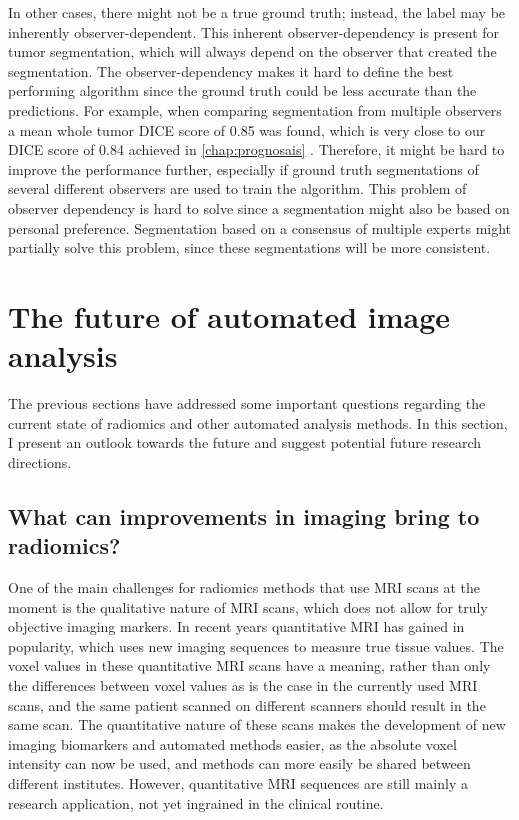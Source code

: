 In other cases, there might not be a true ground truth; instead, the label may be inherently observer-dependent.
This inherent observer-dependency is present for \gls{tumor} segmentation, which will always depend on the observer that created the segmentation.
The observer-dependency makes it hard to define the best performing algorithm since the ground truth could be less accurate than the predictions.
For example, when comparing segmentation from multiple observers a mean whole \gls{tumor} DICE score of 0.85 was found, which is very close to our DICE score of 0.84 achieved in \cref{chap:prognosais} \autocite{menze2015brats}.
Therefore, it might be hard to improve the performance further, especially if ground truth segmentations of several different observers are used to train the algorithm.
This problem of observer dependency is hard to solve since a segmentation might also be based on personal preference.
Segmentation based on a consensus of multiple experts might partially solve this problem, since these segmentations will be more consistent.

\section{The future of automated image analysis}\label{sec:discussion_future}

The previous sections have addressed some important questions regarding the current state of radiomics and other automated analysis methods.
In this section, I present an outlook towards the future and suggest potential future research directions.


\subsection{What can improvements in imaging bring to radiomics?}\label{sec:dicussion_new_imaging}

One of the main challenges for radiomics methods that use \gls{MRI} scans at the moment is the qualitative nature of \gls{MRI} scans, which does not allow for truly objective imaging markers.
In recent years quantitative \gls{MRI} has gained in popularity, which uses new imaging sequences to measure true tissue values.
The voxel values in these quantitative \gls{MRI} scans have a meaning, rather than only the differences between voxel values as is the case in the currently used \gls{MRI} scans, and the same patient scanned on different scanners should result in the same scan.
The quantitative nature of these scans makes the development of new imaging biomarkers and automated methods easier, as the absolute voxel intensity can now be used, and methods can more easily be shared between different institutes.
However, quantitative \gls{MRI} sequences are still mainly a research application, not yet ingrained in the clinical routine.

